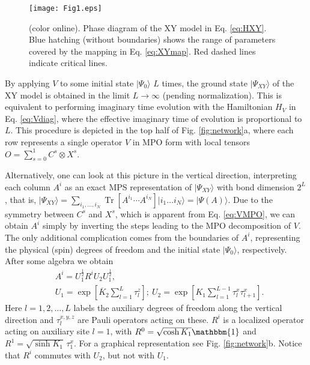 \documentclass[prl,twocolumn,showpacs,floatfix,superscriptaddress,nofootinbib]{revtex4-1}
\DeclareMathOperator{\Tr}{Tr}
\newcommand{\Br}[1]{\left[#1\right]}
\newcommand{\unity}{\ensuremath{\mathbbm{1}}}
\begin{document}
\begin{figure}[t] 
\begin{center}
\texttt{[image: Fig1.eps]}
\end{center}
\caption{(color online). Phase diagram of the XY model in Eq. \eqref{eq:HXY}. Blue hatching (without boundaries) shows the range of parameters covered by the mapping in Eq. \eqref{eq:XYmap}. Red dashed lines indicate critical lines.}
\label{fig:pd}
\end{figure}

By applying $V$ to some initial state $|\Psi_0\rangle$ $L$ times, the ground state $\vert \Psi_{XY}\rangle$ of the XY model is obtained in the limit $L \to \infty$ (pending normalization).
This is equivalent to performing imaginary time evolution with the Hamiltonian $H_V$ in Eq. \eqref{eq:Vdiag}, where the effective imaginary time of evolution is proportional to $L$. 
This procedure is depicted in the top half of Fig. \ref{fig:network}a, where each row represents a single operator $V$ in MPO form with local tensors $O = \sum_{s=0}^1 C^s \otimes X^s$.

Alternatively, one can look at this picture in the vertical direction, interpreting each column $A^i$ as an exact MPS representation of $\vert \Psi_{XY}\rangle$ with bond dimension $2^L$, that is,
$\vert \Psi_{XY}\rangle  = \sum_{i_1,\dotsc, i_N}   \Tr \Br{A^{i_1} \dotsm A^{i_N}} \vert i_1\dotsc i_N  \rangle = \vert \Psi(A)\rangle$.
Due to the symmetry between $C^s$ and $X^s$, which is apparent from Eq. \eqref{eq:VMPO}, we can obtain $A^i$ simply by inverting the steps leading to the MPO decomposition of $V$.
The only additional complication comes from the boundaries of $A^{i}$, representing the physical (spin) degrees of freedom and the initial state $\vert \Psi_0 \rangle$, respectively.
After some algebra we obtain
\begin{eqnarray}  \label{eq:A} 
      &A^i = U_1^{\frac12} R^i U_2 U_1^{\frac12}, \\
      &U_1 = \exp\Br{\overline K_2 \sum_{l=1}^{L} \tau^z_{l}}; \ U_2 =  \exp\Br{ K_1 \sum_{l=1}^{L-1} \tau^x_{l} \tau^x_{l+1}}. \nonumber
\end{eqnarray}
Here $l =1,2, \dotsc, L$ labels the auxiliary degrees of freedom along the vertical direction and $\tau^{x,y,z}_l$ are Pauli operators acting on these. 
$R^i$ is a localized operator acting on auxiliary site $l=1$, with $R^0 = \sqrt{\cosh K_1}\unity$ and $R^1 = \sqrt{\sinh K_1} \, \tau^x_1$.  
For a graphical representation see Fig. \ref{fig:network}b.
Notice that $R^i$ commutes with $U_2$, but not with $U_1$.
\end{document}

